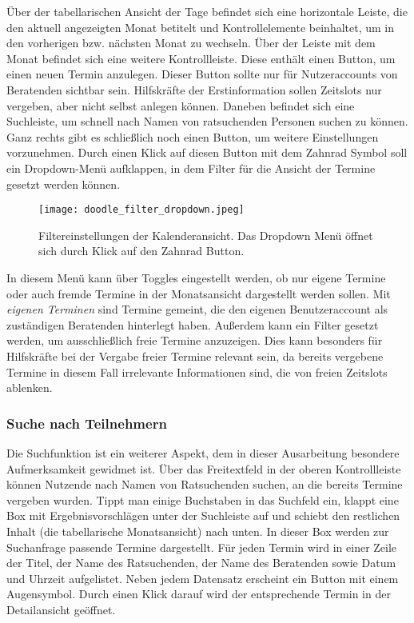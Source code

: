 Über der tabellarischen Ansicht der Tage befindet sich eine horizontale Leiste, die den aktuell angezeigten Monat betitelt und Kontrollelemente beinhaltet, um in den vorherigen bzw. nächsten Monat zu wechseln. Über der Leiste mit dem Monat befindet sich eine weitere Kontrollleiste. Diese enthält einen Button, um einen neuen Termin anzulegen. Dieser Button sollte nur für Nutzeraccounts von Beratenden sichtbar sein. Hilfskräfte der Erstinformation sollen Zeitslots nur vergeben, aber nicht selbst anlegen können. Daneben befindet sich eine Suchleiste, um schnell nach Namen von ratsuchenden Personen suchen zu können. Ganz rechts gibt es schließlich noch einen Button, um weitere Einstellungen vorzunehmen. Durch einen Klick auf diesen Button mit dem Zahnrad Symbol soll ein Dropdown-Menü aufklappen, in dem Filter für die Ansicht der Termine gesetzt werden können.

\begin{figure}[H]
    \caption{Filtereinstellungen der Kalenderansicht. Das Dropdown Menü öffnet sich durch Klick auf den Zahnrad Button.}
    \centering
    \texttt{[image: doodle\_filter\_dropdown.jpeg]}
\end{figure}

In diesem Menü kann über Toggles eingestellt werden, ob nur eigene Termine oder
auch fremde Termine in der Monatsansicht dargestellt werden sollen. Mit
\textit{eigenen Terminen} sind Termine gemeint, die den eigenen Benutzeraccount
als zuständigen Beratenden hinterlegt haben. Außerdem kann ein Filter gesetzt
werden, um ausschließlich freie Termine anzuzeigen. Dies kann besonders für
Hilfskräfte bei der Vergabe freier Termine relevant sein, da bereits vergebene
Termine in diesem Fall irrelevante Informationen sind, die von freien Zeitslots
ablenken.

\subsubsection{Suche nach Teilnehmern}

Die Suchfunktion ist ein weiterer Aspekt, dem in dieser Ausarbeitung besondere
Aufmerksamkeit gewidmet ist. Über das Freitextfeld in der oberen Kontrollleiste
können Nutzende nach Namen von Ratsuchenden suchen, an die bereits Termine
vergeben wurden. Tippt man einige Buchstaben in das Suchfeld ein, klappt eine
Box mit Ergebnisvorschlägen unter der Suchleiste auf und schiebt den restlichen
Inhalt (die tabellarische Monatsansicht) nach unten. In dieser Box werden zur
Suchanfrage passende Termine dargestellt. Für jeden Termin wird in einer Zeile
der Titel, der Name des Ratsuchenden, der Name des Beratenden sowie Datum und
Uhrzeit aufgelistet. Neben jedem Datensatz erscheint ein Button mit einem
Augensymbol. Durch einen Klick darauf wird der entsprechende Termin in der
Detailansicht geöffnet.

